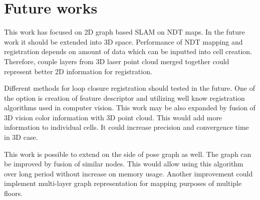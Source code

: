 \chapter{Future works}

This work has focused on 2D graph based \gls{SLAM} on \gls{NDT} maps. In the future work it should be extended into 3D space. Performance of \gls{NDT} mapping and registration depends on amount of data which can be inputted into cell creation. Therefore, couple layers from 3D laser point cloud merged together could represent better 2D information for registration.

Different methods for loop closure registration should tested in the future. One of the option is creation of feature descriptor and utilizing well know registration algorithms used in computer vision. This work may be also expanded by fusion of 3D vision color information with 3D point cloud. This would add more information to individual cells. It could increase precision and convergence time in 3D case.  

This work is possible to extend on the side of pose graph as well. The graph can be improved by fusion of similar nodes. This would allow using this algorithm over long period without increase on memory usage. Another improvement could implement multi-layer graph representation for mapping purposes of multiple floors. 